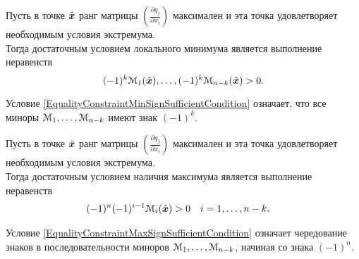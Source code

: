 \begin{teorema}\label{EqualityConstraintMinSufficientCondition}
Пусть в точке $\hat{{\bm x}}$  ранг матрицы $(\frac{\partial g_j}{\partial x_i})$ максимален и 
эта точка удовлетворяет необходимым условия экстремума.\\
Тогда достаточным условием локального минимума является выполнение неравенств
\begin{equation}\label{EqualityConstraintMinSignSufficientCondition}
	(-1)^k{\mathcal M}_1(\hat{{\bm x}}),\ldots,(-1)^k{\mathcal M}_{n-k}(\hat{{\bm x}})>0.
\end{equation}
\end{teorema}
\begin{remark}
Условие \eqref{EqualityConstraintMinSignSufficientCondition} означает, что
все миноры ${\mathcal M}_1,\ldots,{\mathcal M}_{n-k}$ имеют знак $(-1)^k$.
\end{remark}

\begin{teorema}\label{EqualityConstraintMaxSufficientCondition}
Пусть в точке $\hat{{\bm x}}$  ранг матрицы $(\frac{\partial g_j}{\partial x_i})$ максимален и 
эта точка удовлетворяет необходимым условия экстремума.\\
Тогда достаточным условием наличия максимума является выполнение неравенств
\begin{align}\label{EqualityConstraintMaxSignSufficientCondition}
	(-1)^n(-1)^{i-1}{\mathcal M}_i(\hat{{\bm x}})&>0 & i&=1,\ldots,n-k.
\end{align}
\end{teorema}
\begin{remark}
Условие \eqref{EqualityConstraintMaxSignSufficientCondition} означает чередование знаков
в последовательности миноров ${\mathcal M}_1,\ldots,{\mathcal M}_{n-k}$, начиная со знака $(-1)^n$.
\end{remark}
	
